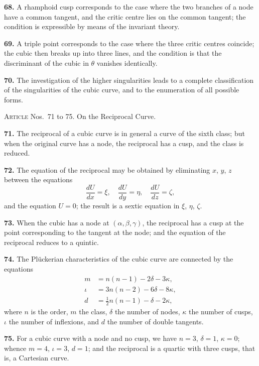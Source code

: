 \documentclass[11pt,a4paper]{article}
\theoremstyle{plain}
\theoremstyle{definition}
\begin{document}
\textbf{68.} A rhamphoid cusp corresponds to the case where the two branches of a node have a common tangent, and the critic centre lies on the common tangent; the condition is expressible by means of the invariant theory.

\textbf{69.} A triple point corresponds to the case where the three critic centres coincide; the cubic then breaks up into three lines, and the condition is that the discriminant of the cubic in $\theta$ vanishes identically.

\textbf{70.} The investigation of the higher singularities leads to a complete classification of the singularities of the cubic curve, and to the enumeration of all possible forms.

\bigskip

\noindent\textsc{Article} Nos.~71 to 75.  On the Reciprocal Curve.

\medskip

\textbf{71.} The reciprocal of a cubic curve is in general a curve of the sixth class; but when the original curve has a node, the reciprocal has a cusp, and the class is reduced.

\textbf{72.} The equation of the reciprocal may be obtained by eliminating $x$, $y$, $z$ between the equations
\[
\frac{dU}{dx} = \xi,\quad \frac{dU}{dy} = \eta,\quad \frac{dU}{dz} = \zeta,
\]
and the equation $U = 0$; the result is a sextic equation in $\xi$, $\eta$, $\zeta$.

\textbf{73.} When the cubic has a node at $(\alpha, \beta, \gamma)$, the reciprocal has a cusp at the point corresponding to the tangent at the node; and the equation of the reciprocal reduces to a quintic.

\textbf{74.} The Pl\"{u}ckerian characteristics of the cubic curve are connected by the equations
\begin{align*}
m &= n(n - 1) - 2\delta - 3\kappa, \\
\iota &= 3n(n - 2) - 6\delta - 8\kappa, \\
d &= \tfrac{1}{2}n(n - 1) - \delta - 2\kappa,
\end{align*}
where $n$ is the order, $m$ the class, $\delta$ the number of nodes, $\kappa$ the number of cusps, $\iota$ the number of inflexions, and $d$ the number of double tangents.

\textbf{75.} For a cubic curve with a node and no cusp, we have $n = 3$, $\delta = 1$, $\kappa = 0$; whence $m = 4$, $\iota = 3$, $d = 1$; and the reciprocal is a quartic with three cusps, that is, a Cartesian curve.
\end{document}
